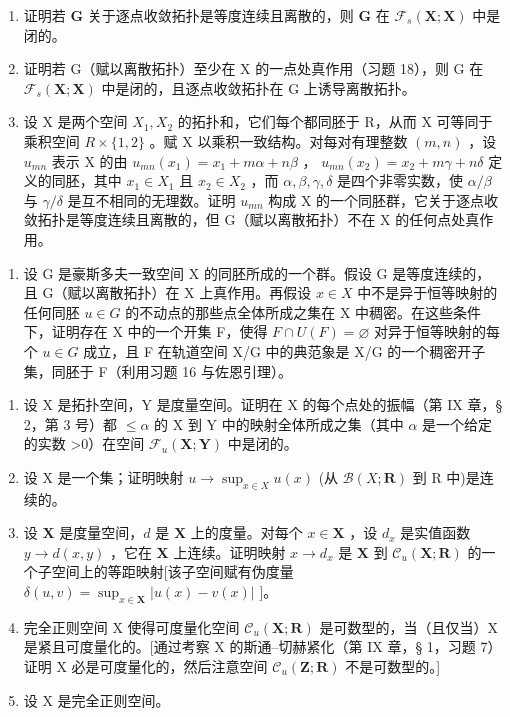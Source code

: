 \begin{enumerate}
\def\labelenumi{\alph{enumi})}
\item
  证明若 \(\mathbf{G}\) 关于逐点收敛拓扑是等度连续且离散的，则 \(\mathbf{G}\) 在 \(\mathcal{F}_s(\mathbf{X};\mathbf{X})\) 中是闭的。
\item
  证明若 G（赋以离散拓扑）至少在 X 的一点处真作用（习题 18），则 G 在 \(\mathcal{F}_{s}(\mathbf{X};\mathbf{X})\) 中是闭的，且逐点收敛拓扑在 G 上诱导离散拓扑。
\item
  设 X 是两个空间 \(X_{1}, X_{2}\) 的拓扑和，它们每个都同胚于 R，从而 X 可等同于乘积空间 \(R \times \{1, 2\}\) 。赋 X 以乘积一致结构。对每对有理整数 \((m, n)\) ，设 \(u_{mn}\) 表示 X 的由 \(u_{mn}(x_{1}) = x_{1} + m\alpha + n\beta\) ， \(u_{mn}(x_{2}) = x_{2} + m\gamma + n\delta\) 定义的同胚，其中 \(x_{1} \in X_{1}\) 且 \(x_{2} \in X_{2}\) ，而 \(\alpha, \beta, \gamma, \delta\) 是四个非零实数，使 \(\alpha/\beta\) 与 \(\gamma/\delta\) 是互不相同的无理数。证明 \(u_{mn}\) 构成 X 的一个同胚群，它关于逐点收敛拓扑是等度连续且离散的，但 G（赋以离散拓扑）不在 X 的任何点处真作用。
\end{enumerate}

\begin{enumerate}
\def\labelenumi{\arabic{enumi})}
\setcounter{enumi}{19}
\tightlist
\item
  设 G 是豪斯多夫一致空间 X 的同胚所成的一个群。假设 G 是等度连续的，且 G（赋以离散拓扑）在 X 上真作用。再假设 \(x \in X\) 中不是异于恒等映射的任何同胚 \(u \in G\) 的不动点的那些点全体所成之集在 X 中稠密。在这些条件下，证明存在 X 中的一个开集 F，使得 \(F \cap U(F) = \varnothing\) 对异于恒等映射的每个 \(u \in G\) 成立，且 F 在轨道空间 X/G 中的典范象是 X/G 的一个稠密开子集，同胚于 F（利用习题 16 与佐恩引理）。
\end{enumerate}

\ExerciseSection

\begin{enumerate}
\def\labelenumi{\arabic{enumi})}
\item
  设 X 是拓扑空间，Y 是度量空间。证明在 X 的每个点处的振幅（第 IX 章，§ 2，第 3 号）都 \(\leqslant\alpha\) 的 X 到 Y 中的映射全体所成之集（其中 \(\alpha\) 是一个给定的实数 \textgreater0）在空间 \(\mathcal{F}_{u}(\mathbf{X};\mathbf{Y})\) 中是闭的。
\item
  设 X 是一个集；证明映射 \(u \to \sup_{x \in X} u(x)\) (从 \(\mathcal{B}(X; \mathbf{R})\) 到 R 中)是连续的。
\item
  设 \(\mathbf{X}\) 是度量空间，\(d\) 是 \(\mathbf{X}\) 上的度量。对每个 \(x \in \mathbf{X}\) ，设 \(d_x\) 是实值函数 \(y \to d(x, y)\) ，它在 \(\mathbf{X}\) 上连续。证明映射 \(x \to d_x\) 是 \(\mathbf{X}\) 到 \(\mathcal{C}_u(\mathbf{X}; \mathbf{R})\) 的一个子空间上的等距映射{[}该子空间赋有伪度量 \(\delta(u, v) = \sup_{x \in \mathbf{X}} |u(x) - v(x)|\) {]}。
\item
  完全正则空间 X 使得可度量化空间 \(\mathcal{C}_{u}(\mathbf{X};\mathbf{R})\) 是可数型的，当（且仅当）X 是紧且可度量化的。{[}通过考察 X 的斯通–切赫紧化（第 IX 章，§ 1，习题 7）证明 X 必是可度量化的，然后注意空间 \(\mathcal{C}_{u}(\mathbf{Z};\mathbf{R})\) 不是可数型的。{]}
\item
  设 X 是完全正则空间。
\end{enumerate}

